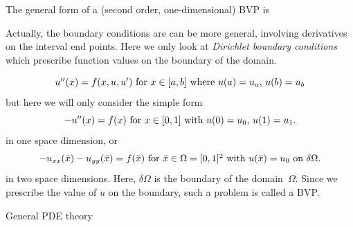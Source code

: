 The general form of a (second order, one-dimensional) \ac{BVP} is
\begin{footnoteenv}
  
{Actually, the boundary conditions are can be more general, involving 
derivatives on the interval end points. Here we only look at
\emph{Dirichlet boundary conditions} which prescribe function values on the boundary of the
domain.}
\end{footnoteenv}

\[ \hbox{$u''(x)=f(x,u,u')$ for $x\in[a,b]$ where $u(a)=u_a$,
  $u(b)=u_b$} \]
but here we will only consider the simple form
\begin{equation}
 \hbox{$-u''(x)=f(x)$ for $x\in[0,1]$ with $u(0)=u_0$, $u(1)=u_1$.}
 \label{eq:2nd-order-bvp}
 \end{equation}
in one space dimension, or
\begin{equation}
 \hbox{$-u_{xx}(\bar x)-u_{yy}(\bar x)=f(\bar x)$ for
   $\bar x\in\Omega=[0,1]^2$ 
    with $u(\bar x)=u_0$ on $\delta\Omega$.}
 \label{eq:2nd-order-bvp-2D}
 \end{equation}
in two space dimensions. Here, $\delta\Omega$ is the boundary of the
domain~$\Omega$. Since we prescribe the value of $u$ on the boundary,
such a problem is called a \acf{BVP}.

 {General PDE theory}
\label{sec:region-influence}

